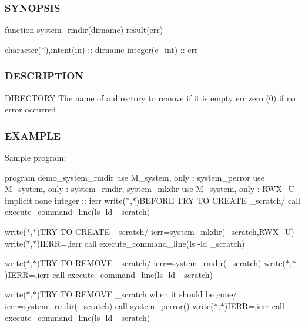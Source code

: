 \subsubsection*{S\+Y\+N\+O\+P\+S\+IS}

\begin{DoxyVerb}function system_rmdir(dirname) result(err)

 character(*),intent(in) :: dirname
 integer(c_int) :: err
\end{DoxyVerb}


\subsubsection*{D\+E\+S\+C\+R\+I\+P\+T\+I\+ON}

D\+I\+R\+E\+C\+T\+O\+RY The name of a directory to remove if it is empty err zero (0) if no error occurred

\subsubsection*{E\+X\+A\+M\+P\+LE}

Sample program\+:

program demo\+\_\+system\+\_\+rmdir use M\+\_\+system, only \+: system\+\_\+perror use M\+\_\+system, only \+: system\+\_\+rmdir, system\+\_\+mkdir use M\+\_\+system, only \+: R\+W\+X\+\_\+U implicit none integer \+:\+: ierr write($\ast$,$\ast$)\textquotesingle{}B\+E\+F\+O\+RE T\+RY TO C\+R\+E\+A\+TE \+\_\+scratch/\textquotesingle{} call execute\+\_\+command\+\_\+line(\textquotesingle{}ls -\/ld \+\_\+scratch\textquotesingle{})

write($\ast$,$\ast$)\textquotesingle{}T\+RY TO C\+R\+E\+A\+TE \+\_\+scratch/\textquotesingle{} ierr=system\+\_\+mkdir(\textquotesingle{}\+\_\+scratch\textquotesingle{},R\+W\+X\+\_\+U) write($\ast$,$\ast$)\textquotesingle{}I\+E\+RR=\textquotesingle{},ierr call execute\+\_\+command\+\_\+line(\textquotesingle{}ls -\/ld \+\_\+scratch\textquotesingle{})

write($\ast$,$\ast$)\textquotesingle{}T\+RY TO R\+E\+M\+O\+VE \+\_\+scratch/\textquotesingle{} ierr=system\+\_\+rmdir(\textquotesingle{}\+\_\+scratch\textquotesingle{}) write($\ast$,$\ast$)\textquotesingle{}I\+E\+RR=\textquotesingle{},ierr call execute\+\_\+command\+\_\+line(\textquotesingle{}ls -\/ld \+\_\+scratch\textquotesingle{})

write($\ast$,$\ast$)\textquotesingle{}T\+RY TO R\+E\+M\+O\+VE \+\_\+scratch when it should be gone/\textquotesingle{} ierr=system\+\_\+rmdir(\textquotesingle{}\+\_\+scratch\textquotesingle{}) call system\+\_\+perror(\textquotesingle{}) write($\ast$,$\ast$)\textquotesingle{}I\+E\+RR=\textquotesingle{},ierr call execute\+\_\+command\+\_\+line(\textquotesingle{}ls -\/ld \+\_\+scratch\textquotesingle{})

